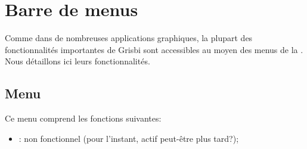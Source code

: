 
\section{Barre de menus\label{home-menus}}


Comme dans de nombreuses applications graphiques, la plupart des fonctionnalités importantes de Grisbi sont accessibles au moyen des menus de la . Nous détaillons ici leurs fonctionnalités.


\subsection{Menu \label{home-menus-file}}

Ce menu comprend les fonctions suivantes:

\vspace{3mm}
\begin{itemize}[rightmargin=.6cm]
	\item {}: non fonctionnel (pour l'instant, actif peut-être plus tard?);	%
\end{itemize}

